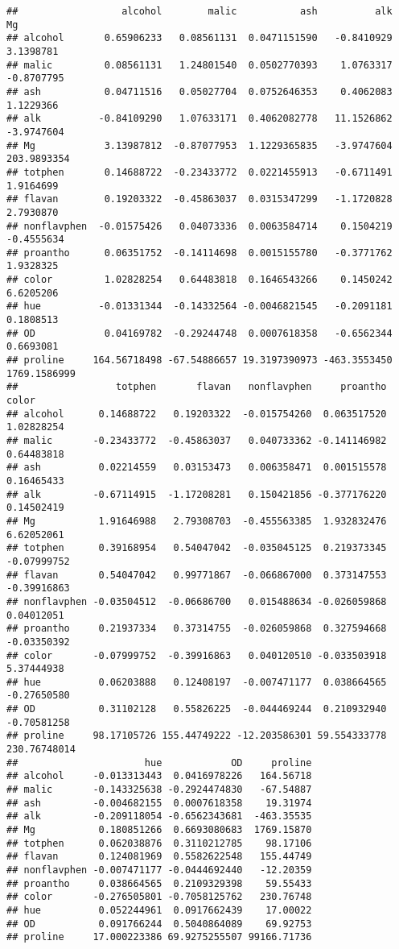 \documentclass[
]{book}
\begin{document}
\begin{verbatim}
##                  alcohol        malic           ash          alk           Mg
## alcohol       0.65906233   0.08561131  0.0471151590   -0.8410929    3.1398781
## malic         0.08561131   1.24801540  0.0502770393    1.0763317   -0.8707795
## ash           0.04711516   0.05027704  0.0752646353    0.4062083    1.1229366
## alk          -0.84109290   1.07633171  0.4062082778   11.1526862   -3.9747604
## Mg            3.13987812  -0.87077953  1.1229365835   -3.9747604  203.9893354
## totphen       0.14688722  -0.23433772  0.0221455913   -0.6711491    1.9164699
## flavan        0.19203322  -0.45863037  0.0315347299   -1.1720828    2.7930870
## nonflavphen  -0.01575426   0.04073336  0.0063584714    0.1504219   -0.4555634
## proantho      0.06351752  -0.14114698  0.0015155780   -0.3771762    1.9328325
## color         1.02828254   0.64483818  0.1646543266    0.1450242    6.6205206
## hue          -0.01331344  -0.14332564 -0.0046821545   -0.2091181    0.1808513
## OD            0.04169782  -0.29244748  0.0007618358   -0.6562344    0.6693081
## proline     164.56718498 -67.54886657 19.3197390973 -463.3553450 1769.1586999
##                 totphen       flavan   nonflavphen     proantho        color
## alcohol      0.14688722   0.19203322  -0.015754260  0.063517520   1.02828254
## malic       -0.23433772  -0.45863037   0.040733362 -0.141146982   0.64483818
## ash          0.02214559   0.03153473   0.006358471  0.001515578   0.16465433
## alk         -0.67114915  -1.17208281   0.150421856 -0.377176220   0.14502419
## Mg           1.91646988   2.79308703  -0.455563385  1.932832476   6.62052061
## totphen      0.39168954   0.54047042  -0.035045125  0.219373345  -0.07999752
## flavan       0.54047042   0.99771867  -0.066867000  0.373147553  -0.39916863
## nonflavphen -0.03504512  -0.06686700   0.015488634 -0.026059868   0.04012051
## proantho     0.21937334   0.37314755  -0.026059868  0.327594668  -0.03350392
## color       -0.07999752  -0.39916863   0.040120510 -0.033503918   5.37444938
## hue          0.06203888   0.12408197  -0.007471177  0.038664565  -0.27650580
## OD           0.31102128   0.55826225  -0.044469244  0.210932940  -0.70581258
## proline     98.17105726 155.44749222 -12.203586301 59.554333778 230.76748014
##                      hue            OD     proline
## alcohol     -0.013313443  0.0416978226   164.56718
## malic       -0.143325638 -0.2924474830   -67.54887
## ash         -0.004682155  0.0007618358    19.31974
## alk         -0.209118054 -0.6562343681  -463.35535
## Mg           0.180851266  0.6693080683  1769.15870
## totphen      0.062038876  0.3110212785    98.17106
## flavan       0.124081969  0.5582622548   155.44749
## nonflavphen -0.007471177 -0.0444692440   -12.20359
## proantho     0.038664565  0.2109329398    59.55433
## color       -0.276505801 -0.7058125762   230.76748
## hue          0.052244961  0.0917662439    17.00022
## OD           0.091766244  0.5040864089    69.92753
## proline     17.000223386 69.9275255507 99166.71736
\end{verbatim}
\end{document}
